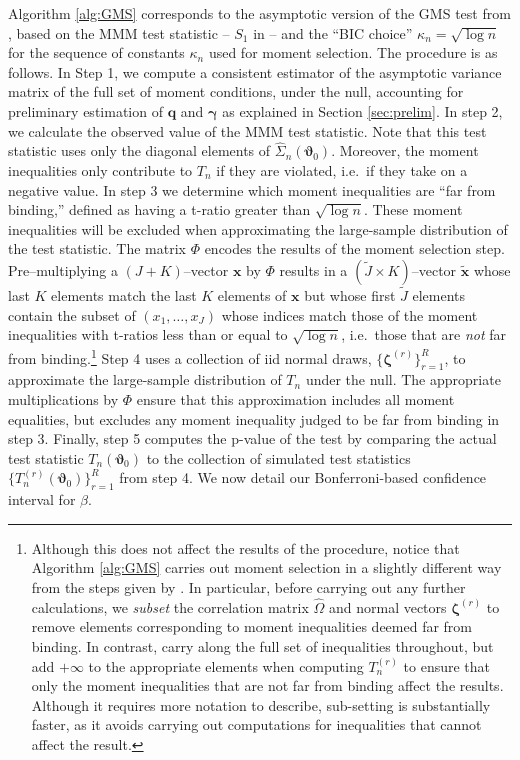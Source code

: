 Algorithm \ref{alg:GMS} corresponds to the asymptotic version of the GMS test from \cite{AndrewsSoares}, based on the MMM test statistic -- $S_1$ in \cite{AndrewsSoares} -- and the ``BIC choice'' $\kappa_n = \sqrt{\log n}$ for the sequence of constants $\kappa_n$ used for moment selection.   
The procedure is as follows.
In Step 1, we compute a consistent estimator of the asymptotic variance matrix of the full set of moment conditions, under the null, accounting for preliminary estimation of $\mathbf{q}$ and $\boldsymbol{\gamma}$ as explained in Section \ref{sec:prelim}.
In step 2, we calculate the observed value of the MMM test statistic.
Note that this test statistic uses only the diagonal elements of $\widehat{\Sigma}_n(\boldsymbol{\vartheta}_0)$.
Moreover, the moment inequalities only contribute to $T_n$ if they are violated, i.e.\ if they take on a negative value.
In step 3 we determine which moment inequalities are ``far from binding,'' defined as having a t-ratio greater than $\sqrt{\log n}$.
These moment inequalities will be excluded when approximating the large-sample distribution of the test statistic.
The matrix $\Phi$ encodes the results of the moment selection step.
Pre--multiplying a $(J + K)$--vector $\mathbf{x}$ by $\Phi$ results in a $(\widetilde{J}\times K)$--vector $\widetilde{\mathbf{x}}$ whose last $K$ elements match the last $K$ elements of $\mathbf{x}$ but whose first $\widetilde{J}$ elements contain the subset of $(x_1, \dots, x_J)$ whose indices match those of the moment inequalities with t-ratios less than or equal to $\sqrt{\log n}$, i.e.\ those that are \emph{not} far from binding.\footnote{Although this does not affect the results of the procedure, notice that Algorithm \ref{alg:GMS} carries out moment selection in a slightly different way from the steps given by \cite{AndrewsSoares}. In particular, before carrying out any further calculations, we \emph{subset} the correlation matrix $\widehat{\Omega}$ and normal vectors $\boldsymbol{\zeta}^{(r)}$ to remove elements corresponding to moment inequalities deemed far from binding. In contrast, \cite{AndrewsSoares} carry along the full set of inequalities throughout, but add $+\infty$ to the appropriate elements when computing $T_n^{(r)}$ to ensure that only the moment inequalities that are not far from binding affect the results. Although it requires more notation to describe, sub-setting is substantially faster, as it avoids carrying out computations for inequalities that cannot affect the result.}
Step 4 uses a collection of iid normal draws, $\{\boldsymbol{\zeta}^{(r)}\}_{r=1}^{R}$, to approximate the large-sample distribution of $T_n$ under the null.
The appropriate multiplications by $\Phi$ ensure that this approximation includes all moment equalities, but excludes any moment inequality judged to be far from binding in step 3.
Finally, step 5 computes the p-value of the test by comparing the actual test statistic $T_n(\boldsymbol{\vartheta}_0)$ to the collection of simulated test statistics $\{T_n^{(r)}(\boldsymbol{\vartheta}_0)\}_{r=1}^R$ from step 4.
We now detail our Bonferroni-based confidence interval for $\beta$.

